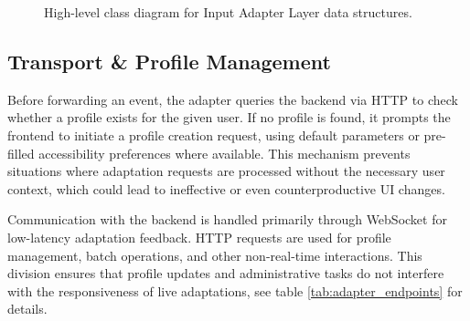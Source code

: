 \documentclass[openany]{book}
\begin{document}
\begin{figure}[H]
\caption{High-level class diagram for Input Adapter Layer data structures.}
\label{fig:adapter-classes}
\end{figure}

\subsection{Transport \& Profile Management}
Before forwarding an event, the adapter queries the backend via HTTP to check whether a profile exists for the given user. If no profile is found, it prompts the frontend to initiate a profile creation request, using default parameters or pre-filled accessibility preferences where available. This mechanism prevents situations where adaptation requests are processed without the necessary user context, which could lead to ineffective or even counterproductive UI changes.

Communication with the backend is handled primarily through WebSocket for low-latency adaptation feedback. HTTP requests are used for profile management, batch operations, and other non-real-time interactions. This division ensures that profile updates and administrative tasks do not interfere with the responsiveness of live adaptations, see table \ref{tab:adapter_endpoints} for details.
\end{document}

